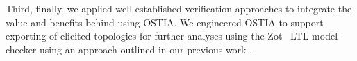 Third, finally, we applied well-established verification approaches to integrate
the value and benefits behind using OSTIA. We engineered OSTIA to support
exporting of elicited topologies for further analyses using the
Zot~\cite{zot}
LTL model-checker using an
approach outlined in our previous work \cite{icsoft,BRS15}.

